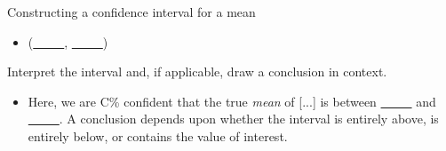\begin{onebox}{Constructing a confidence interval for a mean}
\begin{itemize}
\begin{itemize}
\item[] $SE$ of estimate:  $\frac{s}{\sqrt{n}}$
\item[] $t^{\star}$: use a $t$-table at row $df = n-1$ and confidence level C\%
\end{itemize}
\item[] (\underline{\ \ \ \ \ }, \underline{\ \ \ \ \ })
\end{itemize}
 Interpret the interval and, if applicable, draw a conclusion in context. \vspace{-1mm}
\begin{itemize}
\item[] Here, we are C\%  confident that the true \emph{mean} of [...] is between \underline{\ \ \ \ \ } and  \underline{\ \ \ \ \ }.  A conclusion depends upon whether the interval is entirely above, is entirely below, or contains the value of interest. 
\end{itemize}\end{onebox}

